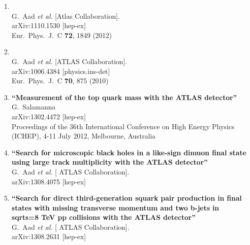 \documentclass{article}
\begin{document}
\begin{enumerate}
\item%
{\bf \color{red}{``Performance of the ATLAS Trigger System in 2010''}}
  \\{}G.~Aad {\it et al.}  [Atlas Collaboration].
  \\{}arXiv:1110.1530 [hep-ex]
\\{}Eur.\ Phys.\ J.\ C {\bf 72}, 1849 (2012) %

\item%
{\bf \color{red}{``Commissioning of the ATLAS Muon Spectrometer with Cosmic Rays''}}
  \\{}G.~Aad {\it et al.}  [ATLAS Collaboration].
  \\{}arXiv:1006.4384 [physics.ins-det]
\\{}Eur.\ Phys.\ J.\ C {\bf 70}, 875 (2010) %

\vspace{1cm}


\item%
{\bf ``Measurement of the top quark mass with the ATLAS detector''}
  \\{}G.~Salamanna
  \\{}arXiv:1302.4472 [hep-ex]
\\{}Proceedings of the 36th International Conference on High Energy Physics (ICHEP), 4-11 July 2012, Melbourne, Australia


\item%
{\bf ``Search for microscopic black holes in a like-sign dimuon final state using large track multiplicity with the ATLAS detector''}
  \\{}G.~Aad {\it et al.}  [ ATLAS Collaboration].
  \\{}arXiv:1308.4075 [hep-ex]
  



\item%
{\bf ``Search for direct third-generation squark pair production in final states with missing transverse momentum and two b-jets in sqrt{s}=8 TeV pp collisions with the ATLAS detector''}
  \\{}G.~Aad {\it et al.}  [ ATLAS Collaboration].
  \\{}arXiv:1308.2631 [hep-ex]
  

\end{enumerate}
\end{document}

